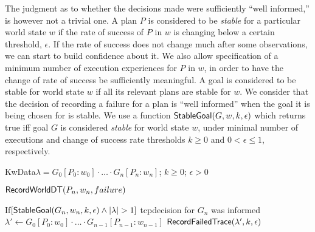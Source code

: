 The judgment as to whether the decisions made were sufficiently ``well
informed,'' is however not a trivial one.  A plan $P$ is considered to
be \emph{stable} for a particular world state $w$ if the rate of
success of $P$ in $w$ is changing below a certain threshold,
$\epsilon$.
If the rate of success does not change much after some
observations, we can start to build confidence about it.
We also allow specification of a minimum number of execution
experiences for $P$ in $w$, in order to have the change of rate of
success be sufficiently meaningful. A goal is considered to be stable
for world state $w$ if all its relevant plans are stable for $w$.  We
consider that the decision of recording a failure for a plan is ``well
informed'' when the goal it is being chosen for is stable.  We use a function
$\mathsf{StableGoal}(G,w,k,\epsilon)$ which returns true iff goal $G$ is
considered \textit{stable} for world state $w$, under minimal
 number of executions and change of success rate thresholds $k \geq 0$
 and $0 < \epsilon \leq 1$, respectively.

\begin{algorithm}\caption{$\RecordTrace(\lambda,k,\epsilon)$}\label{algo:record_failed_exec}
KwData{$\lambda=G_0[P_0:w_0] \cdot \ldots \cdot G_n[P_n:w_n]$; $k\geq0$; $\epsilon > 0$}
\medskip

$\mathsf{RecordWorldDT}(P_n,w_n,failure)$

If{$[\StableGoal(G_n,w_n,k,\epsilon) \land |\lambda|>1]$} {
	tcp{\small decision for $G_n$ was informed}
	$\lambda' \longleftarrow G_0[P_0:w_0] \cdot \ldots \cdot G_{n-1}[P_{n-1}:w_{n-1}]$
	$\mathsf{RecordFailedTrace}(\lambda',k,\epsilon)$
}
\end{algorithm}

